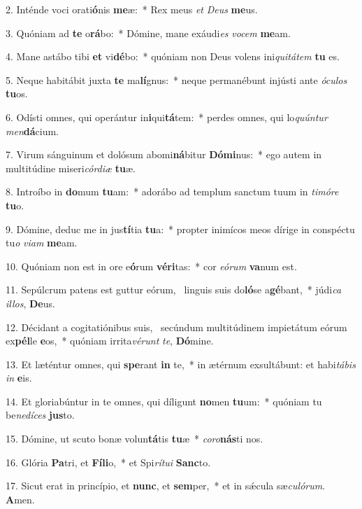 2. Inténde voci orati\textbf{ó}nis \textbf{me}æ:~*  Rex meus \textit{et} \textit{De}\textit{us} \textbf{me}us.\

3. Quóniam ad \textbf{te} o\textbf{rá}bo:~*  Dómine, mane exáudi\textit{es} \textit{vo}\textit{cem} \textbf{me}am.\

4. Mane astábo tibi \textbf{et} vi\textbf{dé}bo:~*  quóniam non Deus volens ini\textit{qui}\textit{tá}\textit{tem} \textbf{tu} es.\

5. Neque habitábit juxta \textbf{te} ma\textbf{lí}gnus:~*  neque permanébunt injústi ante \textit{ó}\textit{cu}\textit{los} \textbf{tu}os.\

6. Odísti omnes, qui operántur in\textbf{i}qui\textbf{tá}tem:~*  perdes omnes, qui lo\textit{quún}\textit{tur} \textit{men}\textbf{dá}cium.\

7. Virum sánguinum et dolósum abomi\textbf{ná}bitur \textbf{Dó}\textbf{mi}nus:~*  ego autem in multitúdine miseri\textit{cór}\textit{di}\textit{æ} \textbf{tu}æ.\

8. Introíbo in \textbf{do}mum \textbf{tu}am:~*  adorábo ad templum sanctum tuum in \textit{ti}\textit{mó}\textit{re} \textbf{tu}o.\

9. Dómine, deduc me in jus\textbf{tí}tia \textbf{tu}a:~*  propter inimícos meos dírige in conspéctu tu\textit{o} \textit{vi}\textit{am} \textbf{me}am.\

10. Quóniam non est in ore e\textbf{ó}rum \textbf{vé}\textbf{ri}tas:~*  cor \textit{e}\textit{ó}\textit{rum} \textbf{va}num est.\

11. Sepúlcrum patens est guttur eórum, \dag\  linguis suis do\textbf{ló}se a\textbf{gé}bant,~*  júdi\textit{ca} \textit{il}\textit{los}, \textbf{De}us.\

12. Décidant a cogitatiónibus suis, \dag\  secúndum multitúdinem impietátum eórum ex\textbf{pél}le \textbf{e}os,~*  quóniam irrita\textit{vé}\textit{runt} \textit{te}, \textbf{Dó}mine.\

13. Et læténtur omnes, qui \textbf{spe}rant \textbf{in} te,~*  in ætérnum exsultábunt: et habi\textit{tá}\textit{bis} \textit{in} \textbf{e}is.\

14. Et gloriabúntur in te omnes, qui díligunt \textbf{no}men \textbf{tu}um:~*  quóniam tu be\textit{ne}\textit{dí}\textit{ces} \textbf{jus}to.\

15. Dómine, ut scuto bonæ volun\textbf{tá}tis \textbf{tu}æ~*  \textit{co}\textit{ro}\textbf{nás}ti nos.\

16. Glória \textbf{Pa}tri, et \textbf{Fí}\textbf{li}o,~*  et Spi\textit{rí}\textit{tu}\textit{i} \textbf{Sanc}to.\

17. Sicut erat in princípio, et \textbf{nunc}, et \textbf{sem}per,~*  et in sǽcula sæ\textit{cu}\textit{ló}\textit{rum}. \textbf{A}men.\

